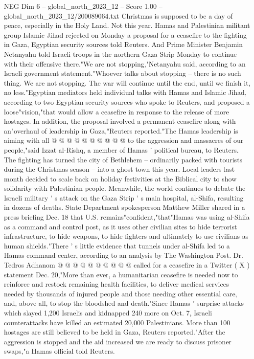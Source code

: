 \begin{textsample}{NEG Dim 6 – global\_north\_2023\_12 – Score 1.00 – global\_north\_2023\_12/200089064.txt}  \label{ex:f6_neg_265}
Christmas is supposed to be a day of peace, especially in the Holy Land.
Not this year.
Hamas and Palestinian militant group Islamic Jihad rejected on Monday a proposal for a ceasefire to the fighting in Gaza, Egyptian security sources told Reuters.
And Prime Minister Benjamin Netanyahu told Israeli troops in the northern Gaza Strip Monday to continue with their offensive there."We are not stopping,"Netanyahu said, according to an Israeli government statement."Whoever talks about stopping -- there is no such thing.
We are not stopping.
The war will continue until the end, until we finish it, no less."Egyptian mediators held individual talks with Hamas and Islamic Jihad, according to two Egyptian security sources who spoke to Reuters, and proposed a loose"vision,"that would allow a ceasefire in response to the release of more hostages.
In addition, the proposal involved a permanent ceasefire along with an"overhaul of leadership in Gaza,"Reuters reported."The Hamas leadership is aiming with all @ @ @ @ @ @ @ @ @ @ to the aggression and massacres of our people,"said Izzat al-Rishq, a member of Hamas ' political bureau, to Reuters.
The fighting has turned the city of Bethlehem -- ordinarily packed with tourists during the Christmas season -- into a ghost town this year.
Local leaders last month decided to scale back on holiday festivities at the Biblical city to show solidarity with Palestinian people.
Meanwhile, the world continues to debate the Israeli military ' s attack on the Gaza Strip ' s main hospital, al-Shifa, resulting in dozens of deaths.
State Department spokesperson Matthew Miller shared in a press briefing Dec. 18 that U.S. remains"confident,"that"Hamas was using al-Shifa as a command and control post, as it uses other civilian sites to hide terrorist infrastructure, to hide weapons, to hide fighters and ultimately to use civilians as human shields."There ' s little evidence that tunnels under al-Shifa led to a Hamas command center, according to an analysis by The Washington Post.
Dr.
Tedros Adhanom @ @ @ @ @ @ @ @ @ @ called for a ceasefire in a Twitter ( X ) statement Dec. 20,"More than ever, a humanitarian ceasefire is needed now to reinforce and restock remaining health facilities, to deliver medical services needed by thousands of injured people and those needing other essential care, and, above all, to stop the bloodshed and death."Since Hamas ' surprise attacks which slayed 1,200 Israelis and kidnapped 240 more on Oct. 7, Israeli counterattacks have killed an estimated 20,000 Palestinians.
More than 100 hostages are still believed to be held in Gaza, Reuters reported."After the aggression is stopped and the aid increased we are ready to discuss prisoner swaps,"a Hamas official told Reuters.

\end{textsample}
